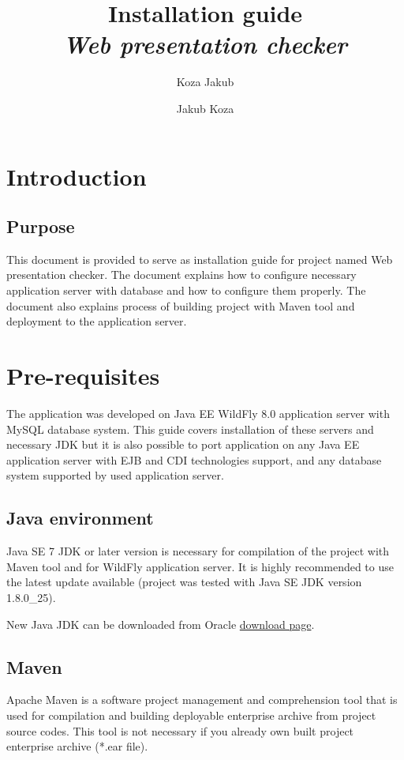 \documentclass[12pt,a4paper]{article}
\author{Koza Jakub}
\author{Jakub Koza}
\title{Installation guide\\\textit{Web presentation checker}}
\begin{document}
\maketitle
\tableofcontents
\newpage

\section{Introduction}
\subsection{Purpose}
This document is provided to serve as installation guide for project named Web presentation checker. The document explains how to configure necessary application server with database and how to configure them properly. The document also explains process of building project with Maven tool and deployment to the application server.
\section{Pre-requisites}
The application was developed on Java EE WildFly 8.0 application server with MySQL database system. This guide covers installation of these servers and necessary JDK but it is also possible to port application on any Java EE application server with EJB and CDI technologies support, and any database system supported by used application server.

\subsection{Java environment}
Java SE 7 JDK or later version is necessary for compilation of the project with Maven tool and for WildFly application server. It is highly recommended to use the latest update available (project was tested with Java SE JDK version 1.8.0\_25). 

New Java JDK can be downloaded from Oracle \href{http://www.oracle.com/technetwork/java/javase/downloads/index.html}{download page}.

\subsection{Maven}
Apache Maven is a software project management and comprehension tool that is used for compilation and building deployable enterprise archive from project source codes. This tool is not necessary if you already own built project enterprise archive (*.ear file). 
\end{document}
